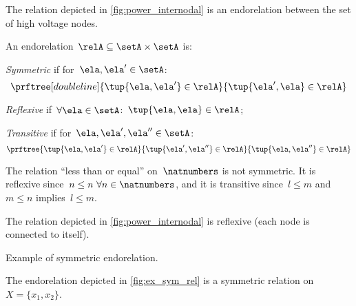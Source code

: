 \begin{example}
    The relation depicted in \cref{fig:power_internodal} is an endorelation between the set of high voltage nodes.
\end{example}

\begin{definition}
    \label{def:properties-endorelations}
    An endorelation~$\relA\subseteq \setA\times \setA$ is:
    \begin{compactitem}
        \item \emph{Symmetric} if for~$\ela, \ela'\in \setA$:
        \begin{equation}
            \prftree[double line]{\tup{\ela,\ela'}\in \relA}{\tup{\ela',\ela}\in \relA}
        \end{equation}
        \item \emph{Reflexive} if~$\forall \ela\in \setA$:~$\tup{\ela,\ela}\in \relA$;
        \item \emph{Transitive} if for~$\ela, \ela', \ela'' \in \setA$:
        \begin{equation}
            \prftree{\tup{\ela,\ela'}\in \relA}{\tup{\ela',\ela''}\in \relA}{\tup{\ela, \ela''}\in \relA}
        \end{equation}
    \end{compactitem}
\end{definition}

\begin{example}
    The relation ``less than or equal'' on~$\natnumbers$ is not symmetric. It is reflexive since~$n\leq n \ \forall n\in \natnumbers$, and it is transitive since~$l\leq m$ and~$m\leq n$ implies~$l\leq m$.
\end{example}

\begin{example}
    The relation depicted in \cref{fig:power_internodal} is reflexive (each node is connected to itself).
\end{example}
\begin{marginfigure}
    \centering
    \caption{Example of symmetric endorelation.}
    \label{fig:ex_sym_rel}
\end{marginfigure}
\begin{example}
    The endorelation depicted in \cref{fig:ex_sym_rel} is a symmetric relation on~$X=\{x_1,x_2\}$.
\end{example}

